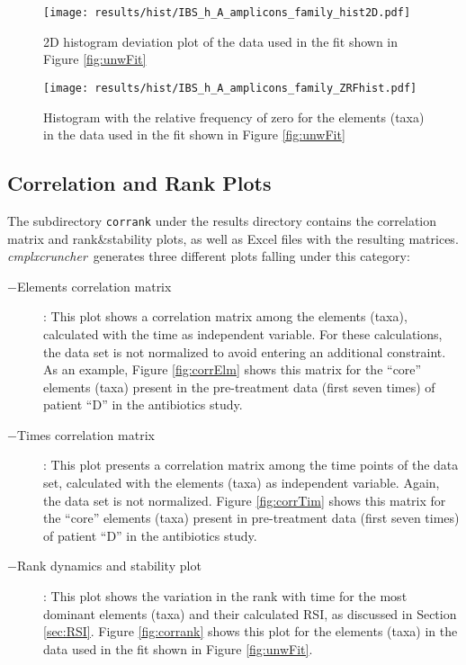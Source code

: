 \documentclass[12pt]{article}
\newcommand{\CC}[0]{\emph{cmplxcruncher}}
\begin{document}
\begin{figure}
	\centering
	\texttt{[image: results/hist/IBS\_h\_A\_amplicons\_family\_hist2D.pdf]}
	\caption{2D histogram deviation plot of the data used in the fit shown in Figure \ref{fig:unwFit}}
	\label{fig:hist2D}
\end{figure}

\begin{figure}
	\centering
	\texttt{[image: results/hist/IBS\_h\_A\_amplicons\_family\_ZRFhist.pdf]}
	\caption{Histogram with the relative frequency of zero for the elements (taxa) in the data used in the fit shown in Figure \ref{fig:unwFit}}
	\label{fig:histZRF}
\end{figure}

\subsection{Correlation and Rank Plots} 
The subdirectory \texttt{corrank} under the results directory contains the correlation matrix and rank\&stability plots, as well as Excel files with the resulting matrices. \CC\ generates three different plots falling under this category:
\begin{description}
	\item[$-$Elements correlation matrix]: This plot shows a correlation matrix among the elements (taxa), calculated with the time as independent variable. For these calculations, the data set is not normalized to avoid entering an additional constraint. As an example, Figure \ref{fig:corrElm} shows this matrix for the ``core'' elements (taxa) present in the pre-treatment data (first seven times) of patient ``D'' in the antibiotics study\cite{antibiotic}. 
	\item[$-$Times correlation matrix]: This plot presents a correlation matrix among the time points of the data set, calculated with the elements (taxa) as independent variable. Again, the data set is not normalized. Figure \ref{fig:corrTim} shows this matrix for the ``core'' elements (taxa) present in pre-treatment data (first seven times) of patient ``D'' in the antibiotics study\cite{antibiotic}. 
	\item[$-$Rank dynamics and stability plot]: This plot shows the variation in the rank with time for the most dominant elements (taxa) and their calculated RSI, as discussed in Section \ref{sec:RSI}. Figure \ref{fig:corrank} shows this plot for the elements (taxa) in the data used in the fit shown in Figure \ref{fig:unwFit}.
\end{description}
\end{document}
